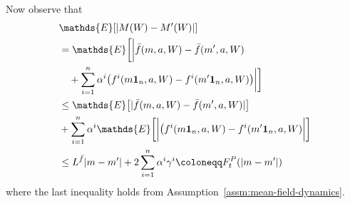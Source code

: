 \documentclass[letterpaper, 10pt]{IEEEtran}
\theoremstyle{plain}
\theoremstyle{nonumberplain}
\theoremstyle{plain}
\newcommand*\EXP{\mathds{E}}
\begin{document}
Now observe that
\begin{align*}
&\EXP[|M(W)-M'(W)|]  \\
&= \EXP\biggl[\biggl|\bar f(m,a,W) - \bar f(m',a,W) \\
&\quad + \sum_{i=1}^n \alpha^i\bigl(f^i(m\textbf{1}_n,a,W) - f^i(m'\textbf{1}_n,a,W) \bigr)\biggr|\biggr] \\
&\leq \EXP\bigl[|\bar f(m,a,W) - \bar f(m',a,W)|\bigr] \\ 
&\hspace{-1em}\quad + \sum_{i=1}^n \alpha^i\EXP\biggl[\biggl|\bigl(f^i(m\textbf{1}_n,a,W) - f^i(m'\textbf{1}_n,a,W)\biggr|\biggr] \\
&\leq L^{\bar f}|m-m'| + 2\sum_{i=1}^n\alpha^i \gamma^i 
\coloneqq F^P_t(|m-m'|)
\end{align*}
where the last inequality holds from Assumption~\ref{assm:mean-field-dynamics}.


\end{document}
